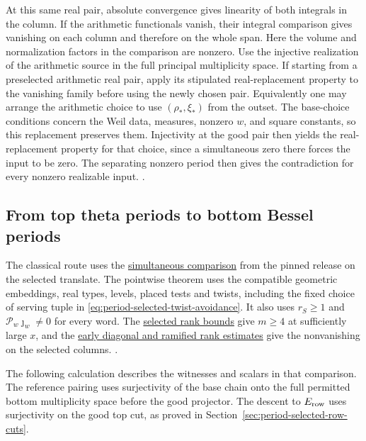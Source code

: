 At this same real
pair, absolute convergence gives linearity of both
integrals in the column. If the arithmetic functionals
vanish, their integral comparison gives vanishing on each
column and therefore on the whole span. Here the volume
and normalization factors in the comparison are nonzero.
Use the injective realization of the arithmetic source in the full
principal multiplicity space. If starting from a preselected arithmetic
real pair, apply its stipulated real-replacement property to the
vanishing family before using the newly chosen pair. Equivalently one may arrange the arithmetic
choice to use \((\rho_*,\xi_*)\) from the outset. The
base-choice conditions concern the Weil data, measures,
nonzero \(w\), and square constants, so this replacement
preserves them. Injectivity at the good pair then yields the
real-replacement property for that choice, since a
simultaneous zero there forces the input to be zero.
The separating nonzero period then gives the contradiction
for every nonzero realizable input.
.

\subsection{From top theta periods to bottom Bessel periods}

The classical route uses the
\hyperlink{candidate.periods}{simultaneous comparison} from the
pinned release on the selected translate. The pointwise theorem
uses the compatible geometric embeddings, real types, levels,
placed tests and twists, including the fixed choice of serving tuple
in \eqref{eq:period-selected-twist-avoidance}. It also uses
\(r_S\ge1\) and \(\mathcal P_w\jmath_w\ne0\) for every word.
The \hyperlink{proof.host-realization}{selected rank bounds} give
\(m\ge4\) at sufficiently large \(x\), and the
\hyperlink{proof.nonzero-anchor}{early diagonal and ramified rank estimates}
give the nonvanishing on the selected columns.
.

The following calculation describes the witnesses and scalars in that
comparison. The reference pairing uses surjectivity of the base chain
onto the full permitted bottom multiplicity space before the good
projector. The descent to \(E_{\rm row}\) uses surjectivity on the good
top cut, as proved in Section~\ref{sec:period-selected-row-cuts}.

